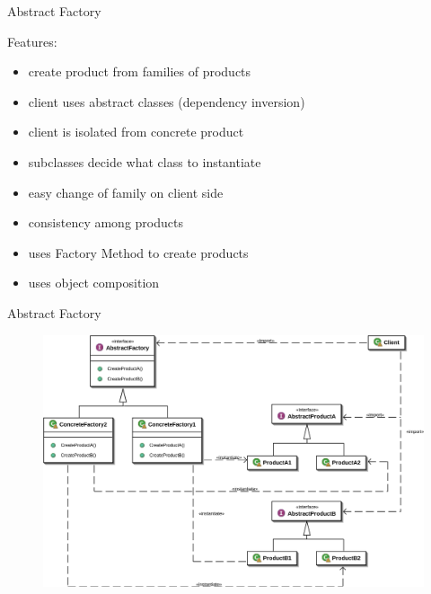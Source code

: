 \documentclass{beamer}
\begin{document}
\begin{frame}{Abstract Factory}
\begin{block}{Features:}
  \begin{itemize}
    \item<1-> create product from families of products
    \item<2-> client uses abstract classes (dependency inversion)
    \item<3-> client is isolated from concrete product
    \item<4-> subclasses decide what class to instantiate
    \item<5-> easy change of family on client side
    \item<6-> consistency among products
    \item<7-> uses Factory Method to create products
    \item<8-> uses object composition
  \end{itemize}
\end{block}
\end{frame}

\begin{frame}{Abstract Factory}
\begin{figure}[t]
  \includegraphics[width=.9\textwidth]{2000px-Abstract_factory_UML.png}
\end{figure}
\end{frame}
\end{document}
